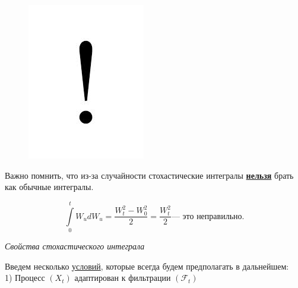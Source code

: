 \documentclass[a4paper]{article}
\begin{document}
 \begin{figure}
     \includegraphics[width=\linewidth]{05_sign.jpg}
 \end{figure}

 Важно помнить, что из-за случайности стохастические интегралы \underline{\bf{нельзя}} брать как обычные интегралы.

 $$\int\limits_{0}^{t}W_udW_u=\frac{W^{2}_{t}-W^{2}_{0}}{2}=\frac{W^{2}_{t}}{2} \text{--- это неправильно.}$$

 \vspace{1pt}

 \begin{center}
 \Large\it{Свойства стохастического интеграла}
 \end{center}

 Введем несколько \underline{условий}, которые всегда будем предполагать в дальнейшем:\\

 1) Процесс $(X_t)$ адаптирован к фильтрации $(\mathcal{F}_t)$\\
\end{document}
